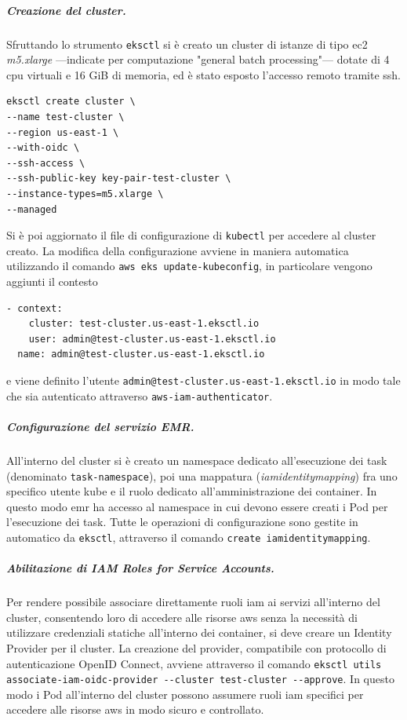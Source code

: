 \documentclass[12pt,a4paper,fleqn,titlepage]{report}
\begin{document}
            \subparagraph{Creazione del cluster.}
            Sfruttando lo strumento \lstinline{eksctl} si è creato un \gls{cluster} di istanze di tipo \gls{ec2} \emph{m5.xlarge} —indicate per computazione "general batch processing"— dotate di 4 \gls{cpu} virtuali e 16 GiB di memoria, ed è stato esposto l'accesso remoto tramite ssh.
            \begin{lstlisting}[numbers=none]
eksctl create cluster \
--name test-cluster \
--region us-east-1 \
--with-oidc \
--ssh-access \
--ssh-public-key key-pair-test-cluster \
--instance-types=m5.xlarge \
--managed
            \end{lstlisting}
            Si è poi aggiornato il file di configurazione di \lstinline{kubectl} per accedere al \gls{cluster} creato. La modifica della configurazione avviene in maniera automatica utilizzando il comando \lstinline{aws eks update-kubeconfig}, in particolare vengono aggiunti il contesto
            \begin{lstlisting}[numbers=none]
- context:
    cluster: test-cluster.us-east-1.eksctl.io
    user: admin@test-cluster.us-east-1.eksctl.io
  name: admin@test-cluster.us-east-1.eksctl.io
            \end{lstlisting}
            e viene definito l'utente \lstinline{admin@test-cluster.us-east-1.eksctl.io} in modo tale che sia autenticato attraverso \lstinline{aws-iam-authenticator}.

            \subparagraph{Configurazione del servizio EMR.}
            All'interno del \gls{cluster} si è creato un namespace dedicato all'esecuzione dei task (denominato \lstinline{task-namespace}), poi una mappatura (\emph{iamidentitymapping}) fra uno specifico utente \gls{kube} e il ruolo dedicato all'amministrazione dei \gls{container}. In questo modo \gls{emr} ha accesso al namespace in cui devono essere creati i Pod per l'esecuzione dei task. Tutte le operazioni di configurazione sono gestite in automatico da \lstinline{eksctl}, attraverso il comando \lstinline{create iamidentitymapping}.

            \subparagraph{Abilitazione di IAM Roles for Service Accounts.}
            Per rendere possibile associare direttamente ruoli \gls{iam} ai servizi all'interno del cluster, consentendo loro di accedere alle risorse \gls{aws} senza la necessità di utilizzare credenziali statiche all'interno dei \gls{container}, si deve creare un Identity Provider per il \gls{cluster}. La creazione del provider, compatibile con protocollo di autenticazione OpenID Connect, avviene attraverso il comando \lstinline{eksctl utils associate-iam-oidc-provider --cluster test-cluster --approve}. In questo modo i Pod all'interno del cluster possono assumere ruoli \gls{iam} specifici per accedere alle risorse \gls{aws} in modo sicuro e controllato.
\end{document}
